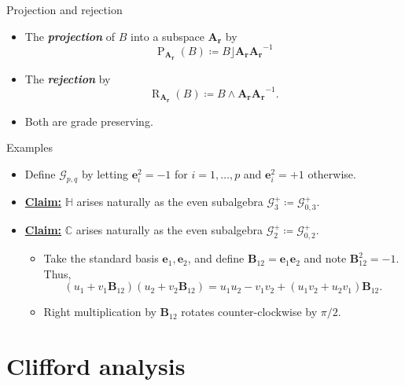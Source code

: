 \documentclass[aspectratio=169]{beamer}
\newcommand\boldgreen[1]{\textcolor{lighter_csu_green}{\emph{\textbf{#1}}}}
\newcommand{\C}{\mathbb{C}}
\newcommand{\G}{\mathcal{G}}
\newcommand{\projection}{\operatorname{P}}
\newcommand{\rejection}{\operatorname{R}}
\newcommand{\blade}[1]{\boldsymbol{#1}}
\newcommand{\bivector}{\blade{B}}
\begin{document}
\begin{frame}{Projection and rejection}
\vfill
\begin{itemize}
\pause
\item The \boldgreen{projection} of $B$ into a subspace $\blade{A_r}$ by
\[
\projection_{\blade{A_r}} (B) \coloneqq B\rfloor \blade{A_r}\blade{A_r}^{-1}
\]
\pause
\item The \boldgreen{rejection} by
\[
\rejection_{\blade{A_r}} (B) \coloneqq B\wedge \blade{A_r}\blade{A_r}^{-1}.
\]
\pause
\item Both are grade preserving.
\end{itemize}
\vfill
\end{frame}

\begin{frame}{Examples}
\vfill
\begin{itemize}
\pause
\item Define $\G_{p,q}$ by letting $\blade{e}_i^2=-1$ for $i=1,\dots,p$ and $\blade{e}_i^2=+1$ otherwise.
\pause
\item \underline{\textbf{Claim:}} $\mathbb{H}$ arises naturally as the even subalgebra $\G_3^+\coloneqq \G_{0,3}^+$.

\pause
\item \underline{\textbf{Claim:}} $\C$ arises naturally as the even subalgebra $\G_2^+\coloneqq \G_{0,2}^+$.
\begin{itemize}
\pause
\item Take the standard basis $\blade{e}_1,\blade{e}_2$, and define $\bivector_{12}= \blade{e}_1\blade{e}_2$ and note $\bivector_{12}^2 = -1$. Thus,
\[
(u_1+v_1 \bivector_{12})(u_2 + v_2 \bivector_{12}) = u_1u_2-v_1 v_2 + (u_1 v_2+u_2v_1)\bivector_{12}.
\]
\pause
\item Right multiplication by $\bivector_{12}$ rotates counter-clockwise by $\pi/2$.
\end{itemize}
\end{itemize}
\vfill
\end{frame}

\section{Clifford analysis}
\end{document}
